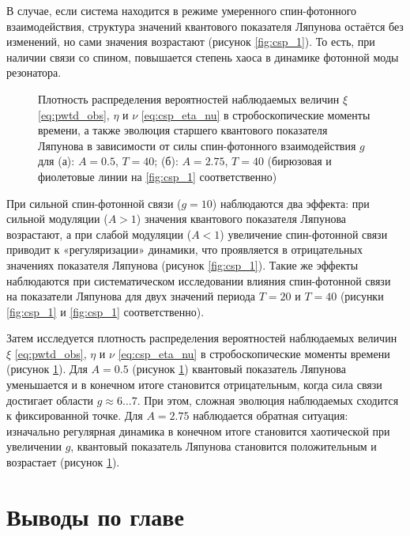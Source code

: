 В случае, если система находится в режиме умеренного спин-фотонного взаимодействия, структура значений квантового показателя Ляпунова остаётся без изменений, но сами значения возрастают (рисунок \cref{fig:csp_1}). То есть, при наличии связи со спином, повышается степень хаоса в динамике фотонной моды резонатора.

\begin{figure}[h!]
	\caption[Старший квантовый показатель Ляпунова в зависимости от периода, амплитуды модуляции и силы взаимодействия между фотонной и спиновой подсистемами.]{
		Плотность распределения вероятностей наблюдаемых величин $\xi$ \cref{eq:pwtd_obs}, $\eta$ и $\nu$ \cref{eq:csp_eta_nu} в стробоскопические моменты времени, а также эволюция старшего квантового показателя Ляпунова в зависимости от силы спин-фотонного взаимодействия $g$ для (а): $A=0.5$, $T=40$; (б): $A=2.75$, $T=40$ (бирюзовая и фиолетовые линии на \cref{fig:csp_1} соответственно)
	}
	\label{fig:csp_2}
\end{figure}

При сильной спин-фотонной связи ($g=10$) наблюдаются два эффекта: при сильной модуляции ($A>1$) значения квантового показателя Ляпунова возрастают, а при слабой модуляции ($A<1$) увеличение спин-фотонной связи приводит к «регуляризации» динамики, что проявляется в отрицательных значениях показателя Ляпунова (рисунок \cref{fig:csp_1}).
Такие же эффекты наблюдаются при систематическом исследовании влияния спин-фотонной связи на показатели Ляпунова для двух значений периода $T=20$ и $T=40$ (рисунки \cref{fig:csp_1} и \cref{fig:csp_1} соответственно).

Затем исследуется плотность распределения вероятностей наблюдаемых величин $\xi$ \cref{eq:pwtd_obs}, $\eta$ и $\nu$ \cref{eq:csp_eta_nu} в стробоскопические моменты времени (рисунок \cref{fig:csp_2}).
Для $A=0.5$ (рисунок \cref{fig:csp_2}) квантовый показатель Ляпунова уменьшается и в конечном итоге становится отрицательным, когда сила связи достигает области $g \approx 6\ldots7$.
При этом, сложная эволюция наблюдаемых сходится к фиксированной точке.
Для $A=2.75$ наблюдается обратная ситуация: изначально регулярная динамика в конечном итоге становится хаотической при увеличении $g$, квантовый показатель Ляпунова становится положительным и возрастает (рисунок \cref{fig:csp_2}).

\section{Выводы по главе}\label{sec:ch3/results}


